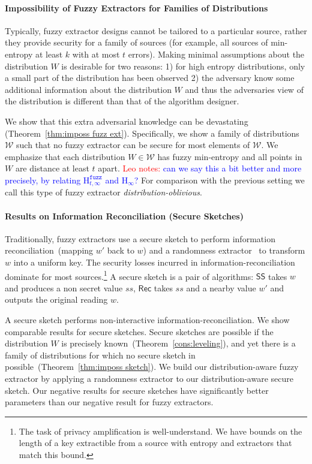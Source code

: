 \documentclass[11pt]{article}
\newcommand{\thref}[1]{\mbox{Theorem~\ref{#1}}}
\newcommand{\class}[1]{{\ensuremath{\mathsf{#1}}}}
\newcommand{\sketch}{\ensuremath{\class{SS}}\xspace}
\newcommand{\rec}{\ensuremath{\class{Rec}}\xspace}
\newcommand{\Hoo}{\mathrm{H}_\infty}
\newcommand{\Hfuzz}{\mathrm{H}^{\mathtt{fuzz}}_{t,\infty}}
\newcommand{\authnote}[2]{{\textcolor{red}{\textsf{#1 notes: }\textcolor{blue}{ #2}}\marginpar{\textcolor{red}{\textbf{!!!!!}}}}}
\newcommand{\authnote}[2]{}
\newcommand{\lnote}[1]{{\authnote{Leo}{#1}}}
\begin{document}
\paragraph{Impossibility of Fuzzy Extractors for Families of Distributions}
Typically, fuzzy extractor designs cannot be tailored to a particular source, rather they provide security for a family of sources (for example, all sources of min-entropy at least $k$ with at most $t$ errors). Making minimal assumptions about the distribution $W$ is desirable for two reasons: 1) for high entropy distributions, only a small part of the distribution has been observed 2) the adversary know some additional information about the distribution $W$ and thus the adversaries view of the distribution is different than that of the algorithm designer.  

We show that this extra adversarial knowledge can be devastating  (\thref{thm:imposs fuzz ext}). 
Specifically, we show a family of distributions $\mathcal{W}$ such that no fuzzy extractor can be secure for most elements of $\mathcal{W}$.  We emphasize that each distribution $W\in \mathcal{W}$ has fuzzy min-entropy and all points in $W$ are distance at least $t$ apart. \lnote{can we say this a bit better and more precisely, by relating $\Hfuzz$ and $\Hoo$?}  For comparison with the previous setting we call this type of fuzzy extractor \emph{distribution-oblivious}.


\paragraph{Results on Information Reconciliation (Secure Sketches)}
Traditionally, fuzzy extractors use a secure sketch to perform information reconciliation~(mapping $w'$ back to $w$) and a randomness extractor~\cite{nisan1993randomness} to transform $w$ into a uniform key.  The security losses incurred in information-reconciliation dominate for most sources.\footnote{The task of privacy amplification is well-understand.  We have bounds on the length of a key extractible from a source with entropy and extractors that match this bound.}  A secure sketch is a pair of algorithms: $\sketch$ takes $w$ and produces a non secret value $ss$, $\rec$ takes $ss$ and a nearby value $w'$ and outputs the original reading $w$.  

A secure sketch performs non-interactive information-reconciliation.  We show comparable results for secure sketches.  Secure sketches are possible if the distribution $W$ is precisely known~(\thref{cons:leveling}), and yet there is a family of distributions for which no secure sketch in possible~(\thref{thm:imposs sketch}). We build our distribution-aware fuzzy extractor by applying a randomness extractor to our distribution-aware secure sketch.  Our negative results for secure sketches have significantly better parameters than our negative result for fuzzy extractors.  
\end{document}
